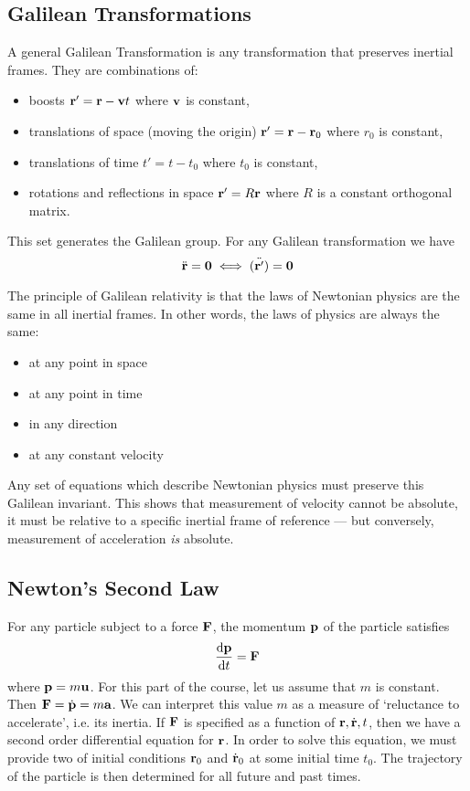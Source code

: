 \documentclass{article}
\begin{document}
\subsection{Galilean Transformations}
A general Galilean Transformation is any transformation that preserves inertial frames. They are combinations of:
\begin{itemize}
    \item boosts $\vb r' = \vb r - \vb vt$ where $\vb v$ is constant,
    \item translations of space (moving the origin) $\vb r' = \vb r - \vb r_0$ where $r_0$ is constant,
    \item translations of time $t' = t - t_0$ where $t_0$ is constant,
    \item rotations and reflections in space $\vb r' = R \vb r$ where $R$ is a constant orthogonal matrix.
\end{itemize}
This set generates the Galilean group. For any Galilean transformation we have
\[ \ddot{\vb r} = \vb 0 \iff \ddot{(\vb r')} = \vb 0 \]

The principle of Galilean relativity is that the laws of Newtonian physics are the same in all inertial frames. In other words, the laws of physics are always the same:
\begin{itemize}
    \item at any point in space
    \item at any point in time
    \item in any direction
    \item at any constant velocity
\end{itemize}
Any set of equations which describe Newtonian physics must preserve this Galilean invariant. This shows that measurement of velocity cannot be absolute, it must be relative to a specific inertial frame of reference --- but conversely, measurement of acceleration \textit{is} absolute.

\subsection{Newton's Second Law}
For any particle subject to a force $\vb F$, the momentum $\vb p$ of the particle satisfies
\[ \frac{\dd \vb p}{\dd{t}} = \vb F \]
where $\vb p = m \vb u$. For this part of the course, let us assume that $m$ is constant. Then $\vb F = \dot{\vb p} = m \vb a$. We can interpret this value $m$ as a measure of `reluctance to accelerate', i.e. its inertia. If $\vb F$ is specified as a function of $\vb r, \dot{\vb r}, t$, then we have a second order differential equation for $\vb r$. In order to solve this equation, we must provide two of initial conditions $\vb r_0$ and $\dot{\vb r}_0$ at some initial time $t_0$. The trajectory of the particle is then determined for all future and past times.
\end{document}
